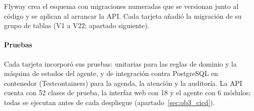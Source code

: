 Flyway crea el esquema con migraciones numeradas que se versionan junto al código y se aplican al arrancar la API. Cada tarjeta añadió la migración de su grupo de tablas (V1 a V22; apartado siguiente).

\paragraph{Pruebas}

Cada tarjeta incorporó sus pruebas: unitarias para las reglas de dominio y la máquina de estados del agente, y de integración contra PostgreSQL en contenedor (Testcontainers) para la agenda, la atención y la auditoría. La API cuenta con 52 clases de prueba, la interfaz web con 18 y el agente con 6 módulos; todas se ejecutan antes de cada despliegue (apartado~\ref{sec:ob3_cicd}).

